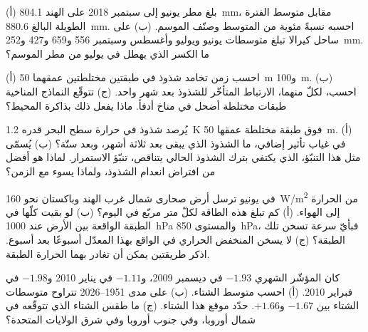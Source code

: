 \begin{exercise}[$\star$]\label{exo:b2:climate-variability:4}
(أ) بلغ مطر يونيو إلى سبتمبر 2018 على الهند \qty{804.1}{mm}، مقابل
متوسط الفترة الطويلة البالغ \qty{880.6}{mm}. احسبه نسبةً مئوية من المتوسط وصنّف
الموسم. (ب) على ساحل كيرالا تبلغ متوسطات يونيو ويوليو وأغسطس وسبتمبر 556
و659 و427 و\qty{252}{mm}. ما الكسر الذي يهطل في يوليو من مطر الموسم؟
\end{exercise}

\begin{exercise}[$\star\star$]\label{exo:b2:climate-variability:5}
(أ) احسب زمن تخامد شذوذ في طبقتين مختلطتين عمقهما \qty{50}{m} و\qty{100}{m}.
(ب) احسب، لكلّ منهما، الارتباط المتأخّر للشذوذ بعد شهر واحد. (ج) تتوقّع
النماذج المناخية طبقات مختلطة أضحل في مناخ أدفأ. ماذا يفعل ذلك بذاكرة
المحيط؟
\end{exercise}

\begin{exercise}[$\star\star$]\label{exo:b2:climate-variability:6}
يُرصد شذوذ في حرارة سطح البحر قدره \qty{+1.2}{K} فوق طبقة مختلطة عمقها \qty{50}{m}.
(أ) في غياب تأثير إضافي، ما الشذوذ الذي يبقى بعد ثلاثة أشهر، وبعد ستّة؟ (ب)
يُسمّى مثل هذا التنبّؤ، الذي يكتفي بترك الشذوذ الحالي يتناقص، تنبّؤ الاستمرار.
لماذا هو أفضل من افتراض انعدام الشذوذ، ولماذا يسوء مع الزمن؟
\end{exercise}

\begin{exercise}[$\star\star$]\label{exo:b2:climate-variability:7}
في يونيو ترسل أرض صحارى شمال غرب الهند وباكستان نحو
\qty{160}{W/m^2} من الحرارة إلى الهواء. (أ) كم تبلغ هذه الطاقة لكلّ متر مربّع في اليوم؟
(ب) لو بقيت كلّها في الطبقة الواقعة بين الأرض عند \qty{1000}{hPa} والمستوى \qty{850}{hPa}، فبأيّ
سرعة تسخن تلك الطبقة؟ (ج) لا يسخن المنخفض الحراري في الواقع بهذا المعدّل أسبوعًا بعد أسبوع.
اذكر طريقتين يمكن أن تغادر بهما الحرارة الطبقة.
\end{exercise}

\begin{exercise}[$\star\star$]\label{exo:b2:climate-variability:8}
كان المؤشّر الشهري  $-1.93$ في ديسمبر 2009، و$-1.11$ في يناير 2010 و$-1.98$ في
فبراير 2010. (أ) احسب متوسط الشتاء. (ب) على مدى 1951--2026 تتراوح متوسطات الشتاء بين
$-1.67$ و$+1.66$. حدّد موقع هذا الشتاء. (ج) ما طقس الشتاء الذي تتوقّعه في شمال
أوروبا، وفي جنوب أوروبا وفي شرق الولايات المتحدة؟
\end{exercise}

